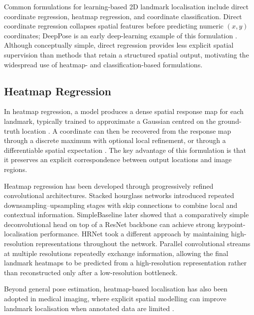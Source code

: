 Common formulations for learning-based 2D landmark localisation
include direct coordinate regression, heatmap regression, and
coordinate classification. Direct coordinate regression collapses
spatial features before predicting numeric $(x,y)$ coordinates;
DeepPose is an early deep-learning example of this formulation
\parencite{toshev2014deeppose}. Although conceptually simple, direct
regression provides less explicit spatial supervision than methods
that retain a structured spatial output, motivating the widespread
use of heatmap- and classification-based formulations.


\subsection{Heatmap Regression}
\label{sec:bg-heatmap}

In heatmap regression, a model produces a dense spatial response map
for each landmark, typically trained to approximate a Gaussian centred
on the ground-truth location
\parencite{tompson2014joint}. A coordinate can then be recovered from
the response map through a discrete maximum with optional local
refinement, or through a differentiable spatial expectation
\parencite{sun2018integral}. The key advantage of this formulation is
that it preserves an explicit correspondence between output locations
and image regions.

Heatmap regression has been developed through progressively refined
convolutional architectures. Stacked hourglass networks
\parencite{newell2016hourglass} introduced repeated
downsampling--upsampling stages with skip connections to combine local
and contextual information. SimpleBaseline
\parencite{xiao2018simple} later showed that a comparatively simple
deconvolutional head on top of a ResNet backbone
\parencite{he2016resnet} can achieve strong keypoint-localisation
performance. HRNet \parencite{sun2019hrnet} took a different approach
by maintaining high-resolution representations throughout the network.
Parallel convolutional streams at multiple resolutions repeatedly
exchange information, allowing the final landmark heatmaps to be
predicted from a high-resolution representation rather than
reconstructed only after a low-resolution bottleneck.

Beyond general pose estimation, heatmap-based localisation has also
been adopted in medical imaging, where explicit spatial modelling can
improve landmark localisation when annotated data are limited
\parencite{payer2019spatial}.


